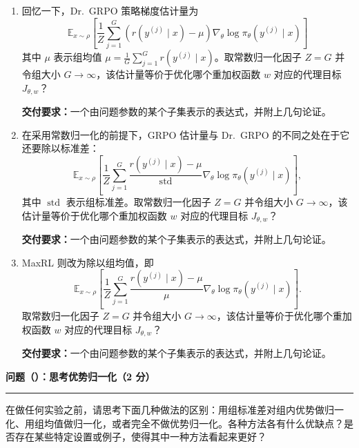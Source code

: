 \begin{enumerate}[label=(\alph*)]
  \item 回忆一下，Dr.\ GRPO 策略梯度估计量为
  \begin{equation}
  \mathbb{E}_{x\sim\rho}\!\left[\frac{1}{Z}\sum_{j=1}^{G}\left(r(y^{(j)} \mid x) - \mu\right)\nabla_\theta \log \pi_\theta\!\left(y^{(j)} \mid x\right)\right]
  \end{equation}
  其中 $\mu$ 表示组均值 $\mu = \frac{1}{G}\sum_{j=1}^{G} r(y^{(j)} \mid x)$。取常数归一化因子 $Z = G$ 并令组大小 $G \to \infty$，该估计量等价于优化哪个重加权函数 $w$ 对应的代理目标 $J_{\theta,w}$？

  \textbf{交付要求：}一个由问题参数的某个子集表示的表达式，并附上几句论证。

  \item 在采用常数归一化的前提下，GRPO 估计量与 Dr.\ GRPO 的不同之处在于它还要除以标准差：
  \begin{equation}
  \mathbb{E}_{x\sim\rho}\!\left[\frac{1}{Z}\sum_{j=1}^{G}\frac{r(y^{(j)} \mid x) - \mu}{\operatorname{std}}\nabla_\theta \log \pi_\theta\!\left(y^{(j)} \mid x\right)\right],
  \end{equation}
  其中 $\operatorname{std}$ 表示组标准差。取常数归一化因子 $Z = G$ 并令组大小 $G \to \infty$，该估计量等价于优化哪个重加权函数 $w$ 对应的代理目标 $J_{\theta,w}$？

  \textbf{交付要求：}一个由问题参数的某个子集表示的表达式，并附上几句论证。

  \item MaxRL 则改为除以组均值，即
  \begin{equation}
  \mathbb{E}_{x\sim\rho}\!\left[\frac{1}{Z}\sum_{j=1}^{G}\frac{r(y^{(j)} \mid x) - \mu}{\mu}\nabla_\theta \log \pi_\theta\!\left(y^{(j)} \mid x\right)\right].
  \end{equation}
  取常数归一化因子 $Z = G$ 并令组大小 $G \to \infty$，该估计量等价于优化哪个重加权函数 $w$ 对应的代理目标 $J_{\theta,w}$？

  \textbf{交付要求：}一个由问题参数的某个子集表示的表达式，并附上几句论证。
\end{enumerate}

\medskip
\noindent\textbf{问题（）：思考优势归一化（2 分）}
\par\nobreak\smallskip\hrule\nobreak\medskip

在做任何实验之前，请思考下面几种做法的区别：用组标准差对组内优势做归一化、用组均值做归一化，或者完全不做优势归一化。各种方法各有什么优缺点？是否存在某些特定设置或例子，使得其中一种方法看起来更好？

